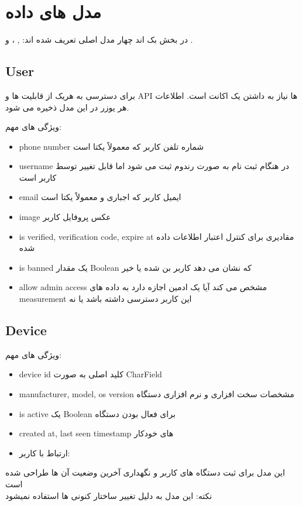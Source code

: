 \section{مدل های داده}
در بخش بک اند چهار مدل اصلی تعریف شده اند: , ،  و .

\subsection{User}
برای دسترسی به هریک از قابلیت ها و API ها نیاز به داشتن یک اکانت است. اطلاعات هر یوزر در این مدل ذخیره می شود.

ویژگی های مهم:
\begin{itemize}
  \item phone number شماره تلفن کاربر که معمولاً یکتا است
  \item username در هنگام ثبت نام به صورت رندوم ثبت می شود اما قابل تغییر توسط کاربر است
  \item email ایمیل کاربر که اجباری و معمولاً یکتا است
  \item image عکس پروفایل کاربر
  \item is verified, verification code, expire at مقادیری برای کنترل اعتبار اطلاعات داده شده
  \item is banned یک مقدار Boolean که نشان می دهد کاربر بن شده یا خیر
  \item allow admin access مشخص می کند آیا یک ادمین اجازه دارد به داده های measurement این کاربر دسترسی داشته باشد یا نه
\end{itemize}

\subsection{Device}
ویژگی های مهم:
\begin{itemize}
  \item device id کلید اصلی به صورت CharField
  \item manufacturer, model, os version مشخصات سخت افزاری و نرم افزاری دستگاه
  \item is active یک Boolean برای فعال بودن دستگاه
  \item created at, last seen timestamp های خودکار
  \item ارتباط با کاربر: 
\end{itemize}
این مدل برای ثبت دستگاه های کاربر و نگهداری آخرین وضعیت آن ها طراحی شده است
\\
نکته: این مدل به دلیل تغییر ساختار کنونی  ها استفاده نمیشود
